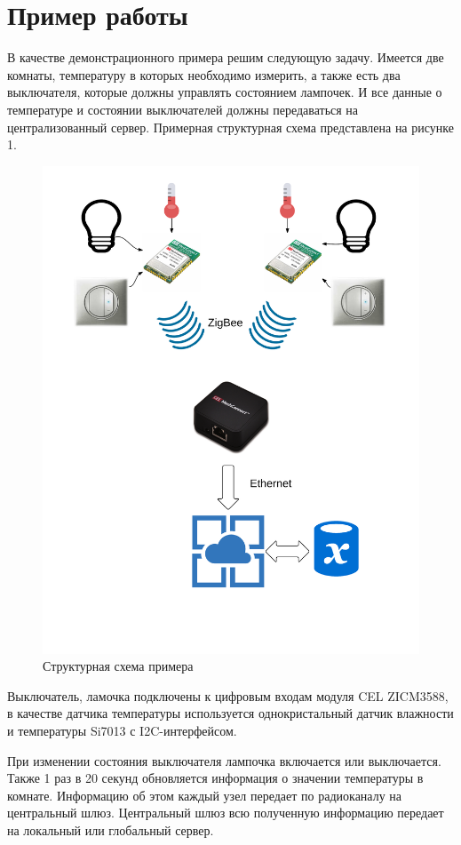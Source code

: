 \documentclass[12pt]{article}
\begin{document}
\section{Пример работы}
В качестве демонстрационного примера решим следующую задачу. Имеется две комнаты,
температуру в которых необходимо измерить, а также есть два выключателя, которые
должны управлять состоянием лампочек. И все данные о температуре и состоянии
выключателей должны передаваться на централизованный сервер. Примерная структурная
схема представлена на рисунке 1.
\begin{figure}[h!]
    \centering
    \includegraphics[scale=0.5]{cel-structure.png}
    \caption{Структурная схема примера}
\end{figure}

Выключатель, ламочка подключены к цифровым входам модуля CEL ZICM3588, в качестве
датчика температуры используется однокристальный датчик влажности и температуры
Si7013 с I2C-интерфейсом.

При изменении состояния выключателя лампочка включается или выключается. Также 1 раз в 20
секунд обновляется информация о значении температуры в комнате. Информацию об этом
каждый узел передает по радиоканалу на центральный шлюз. Центральный шлюз всю
полученную информацию передает на локальный или глобальный сервер.
\end{document}
